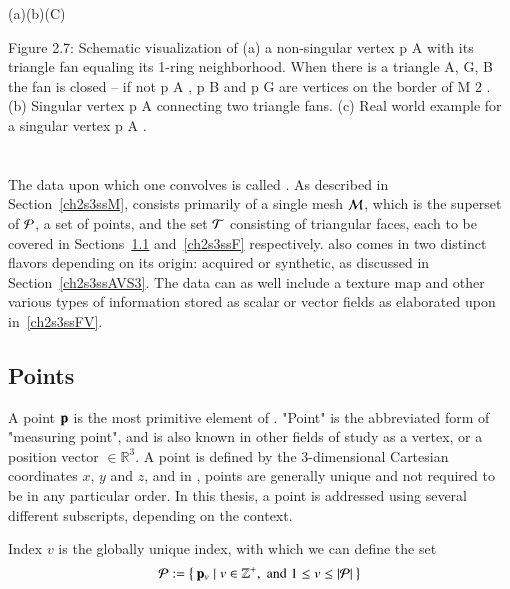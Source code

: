 (a)(b)(C)

Figure 2.7: Schematic visualization of (a) a non-singular vertex p A with its triangle fan equaling its 1-ring neighborhood. When there is a triangle {A, G, B} the fan is closed – if not p A , p B and p G are vertices on the border of M 2 . (b) Singular vertex p A connecting two triangle fans. (c) Real world example for a singular vertex p A .~\cite[p.~29]{Mara12}
%
%
%
%
%
\section{\tdd}
\label{ch2s3}
The data upon which one convolves  is called \tdd{}. As described in Section~\ref{ch2s3ssM}, \tdd{} consists primarily of a single mesh $\mathcal{M}$, which is the superset of $\mathcal{P}$, a set of points, and the set $\mathcal{T}$ consisting of triangular faces, each to be covered in Sections~\ref{ch2s3ssP} and~\ref{ch2s3ssF} respectively. \tdd{} also comes in two distinct flavors depending on its origin: acquired or synthetic, as discussed in Section~\ref{ch2s3ssAVS3}. The data can as well include a texture map and other various types of information stored as scalar or vector fields as elaborated upon  in~\ref{ch2s3ssFV}.
%
\subsection{Points}
\label{ch2s3ssP}
A point $\mathbf{p}$ is the most primitive element of \tdd{}. "Point" is the abbreviated form of "measuring point", and is also known in other fields of study as a vertex, or a position vector $\in \mathbb{R}^3$. A point is defined by the 3-dimensional Cartesian coordinates $x$, $y$ and $z$, and in \tdd{}, points are generally unique and not required to be in any particular order. In this thesis, a point is addressed using several different subscripts, depending on the context.

Index $v$ is the globally unique index, with which we can define the set
\begin{equation}
	\mathcal{P} := \left \{\:\mathbf{p}_v \mid v \in \mathbb{Z}^+, \;\text{and}\; 1\leq v \leq|\mathcal{P}|\:\right \}
	\label{eq:defineSetOfPoints}
\end{equation}%
%
%
%
%

